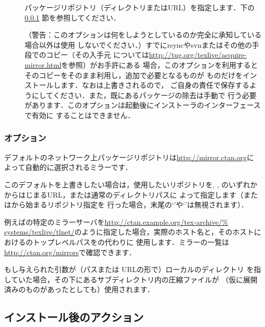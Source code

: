 \documentclass[uplatex,dvipdfmx]{jsarticle}
\begin{document}
\begin{description}
\item[]
パッケージリポジトリ（ディレクトリまたはURL）を指定します．下の\ref{sec:location}%
節を参照してください．

\item[]
（警告：このオプションは何をしようとしているのか完全に承知している場合以外は使用
しないでください．）すでにrsyncやsvnまたはその他の手段で\TL のコピー（その入手元
については\url{http://tug.org/texlive/acquire-mirror.html}を参照）がお手許にある
場合，このオプションを利用するとそのコピーをそのまま利用し，追加で必要となるものが
ものだけをインストールします．なおは上書きされるので，
ご自身の責任で保存するようにしてください．また，既にあるパッケージの除去は手動で
行う必要があります．このオプションは起動後にインストーラのインターフェースで有効に
することはできません．
\end{description}

\subsubsection{オプション}
\label{sec:location}

デフォルトのネットワーク上パッケージリポジトリは\url{http://mirror.ctan.org}に
よって自動的に選択される\CTAN ミラーです．

このデフォルトを上書きしたい場合は，使用したいリポジトリを, , のいずれかからはじまるURL，または通常のディレクトリパスに
よって指定します（またはから始まるリポジトリ指定を
行った場合，末尾の`\code{/}'や`'は無視されます）．

例えば\CTAN の特定のミラーサーバを\url{http://ctan.example.org/tex-archive/%
systems/texlive/tlnet/}のように指定した場合，実際のホスト名と，そのホストに
おける\CTAN のトップレベルパスをの代わりに
使用します．\CTAN ミラーの一覧は\url{http://ctan.org/mirrors}で確認できます．

もし与えられた引数が（パスまたは URLの形で）ローカルのディレクトリ
を指していた場合，その下にあるサブディレクトリ内の圧縮ファイルが
（仮に展開済みのものがあったとしても）使用されます．

\subsection{インストール後のアクション}
\label{sec:postinstall}
\end{document}
